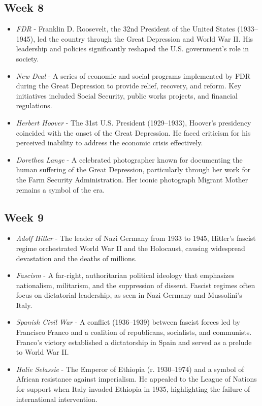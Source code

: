 \documentclass[12pt]{article}
\begin{document}
\subsection*{Week 8}

\begin{itemize}
    \item\textit{FDR} - Franklin D. Roosevelt, the 32nd President of the United States (1933–1945), led the country through the Great Depression and World War II. His leadership and policies significantly reshaped the U.S. government’s role in society.

    \item\textit{New Deal} - A series of economic and social programs implemented by FDR during the Great Depression to provide relief, recovery, and reform. Key initiatives included Social Security, public works projects, and financial regulations.
    
    \item\textit{Herbert Hoover} - The 31st U.S. President (1929–1933), Hoover’s presidency coincided with the onset of the Great Depression. He faced criticism for his perceived inability to address the economic crisis effectively.
    
    \item\textit{Dorethea Lange} - A celebrated photographer known for documenting the human suffering of the Great Depression, particularly through her work for the Farm Security Administration. Her iconic photograph Migrant Mother remains a symbol of the era.
\end{itemize}

\subsection*{Week 9}

\begin{itemize}
    \item\textit{Adolf Hitler} - The leader of Nazi Germany from 1933 to 1945, Hitler’s fascist regime orchestrated World War II and the Holocaust, causing widespread devastation and the deaths of millions.

    \item\textit{Fascism} - A far-right, authoritarian political ideology that emphasizes nationalism, militarism, and the suppression of dissent. Fascist regimes often focus on dictatorial leadership, as seen in Nazi Germany and Mussolini's Italy.
    
    \item\textit{Spanish Civil War} - A conflict (1936–1939) between fascist forces led by Francisco Franco and a coalition of republicans, socialists, and communists. Franco’s victory established a dictatorship in Spain and served as a prelude to World War II.
    
    \item\textit{Halie Selassie} - The Emperor of Ethiopia (r. 1930–1974) and a symbol of African resistance against imperialism. He appealed to the League of Nations for support when Italy invaded Ethiopia in 1935, highlighting the failure of international intervention.
\end{itemize}
\end{document}
